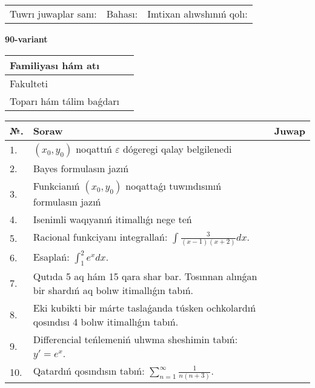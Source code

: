 \documentclass{article}
\begin{document}
\vspace{1cm}

\begin{tabular}{ c c c }
Tuwrı juwaplar sanı: \underline{\hspace{2cm}} & Bahası: \underline{\hspace{2cm}} & Imtixan alıwshınıń qolı: \underline{\hspace{2cm}} \\
\end{tabular}

\newpage

\begin{center}\textbf{90-variant}\end{center}

\bgroup
\def\arraystretch{1.5}
\begin{tabular}{ |m{6cm}|m{10cm}| }
  \hline
  Familiyası hám atı & \\
  \hline
  Fakulteti &\\
  \hline
  Toparı hám tálim baǵdarı & \\
  \hline
\end{tabular}
\egroup

\vspace{0.5cm}

\bgroup
\def\arraystretch{2}
\begin{tabular}{ |l|m{8cm}|m{7cm}| }
  \hline
  №. & Soraw & Juwap \\
  \hline
  1. & $(x_{0} , y_{0})$ noqattıń $\varepsilon$ dógeregi qalay belgilenedi &  \\
  \hline
  2. & Bayes formulasın jazıń &  \\
  \hline
  3. & Funkcianıń $(x_{0}, y_{0})$ noqattaǵı tuwındısınıń formulasın jazıń &  \\
  \hline
  4. & Isenimli waqıyanıń itimallıǵı nege teń &  \\
  \hline
  5. & Racional funkciyanı integrallań: $\displaystyle\int {\frac{3}{(x - 1)(x + 2)}dx}$. &  \\
  \hline
  6. & Esaplań: $\displaystyle\int_{1}^{2}{e^{x}dx}$. &  \\
  \hline
  7. & Qutıda 5 aq hám 15 qara shar bar. Tosınnan alınǵan bir shardıń aq bolıw itimallıǵın tabıń. &  \\
  \hline
  8. & Eki kubikti bir márte taslaǵanda túsken ochkolardıń qosındısı 4 bolıw itimallıǵın tabıń. &  \\
  \hline
  9. & Differencial teńlemeniń ulıwma sheshimin tabıń: $y'=e^{x}$. &  \\
  \hline
  10. & Qatardıń qosındısın tabıń: $\displaystyle\sum_{n = 1}^{\infty}\frac{1}{n(n + 3)}$. &  \\
  \hline
\end{tabular}
\egroup
\end{document}
